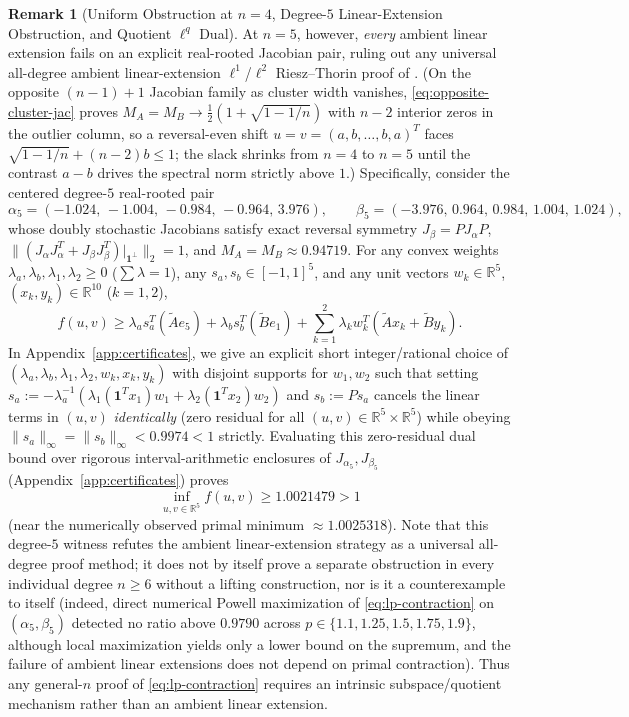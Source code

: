 \documentclass[11pt,a4paper]{article}
\theoremstyle{definition}
\newtheorem{remark}[theorem]{Remark}
\newcommand{\R}{\mathbb{R}}
\newcommand{\one}{\mathbf{1}}
\begin{document}
\begin{remark}[Uniform Obstruction at $n = 4$, Degree-$5$ Linear-Extension Obstruction, and Quotient $\ell^q$ Dual]
At $n = 5$, however, \emph{every} ambient linear extension fails on an explicit real-rooted Jacobian pair, ruling out any universal all-degree ambient linear-extension $\ell^1$/$\ell^2$ Riesz--Thorin proof of \cite[Conjecture~5.2]{Hashemi2026}. (On the opposite $(n-1)+1$ Jacobian family as cluster width vanishes, \eqref{eq:opposite-cluster-jac} proves $M_A = M_B \to \frac{1}{2}(1 + \sqrt{1 - 1/n})$ with $n-2$ interior zeros in the outlier column, so a reversal-even shift $u = v = (a, b, \dots, b, a)^T$ faces $\sqrt{1 - 1/n} + (n-2)b \le 1$; the slack shrinks from $n=4$ to $n=5$ until the contrast $a - b$ drives the spectral norm strictly above $1$.) Specifically, consider the centered degree-$5$ real-rooted pair
\[
\alpha_5 = (-1.024,\, -1.004,\, -0.984,\, -0.964,\, 3.976), \qquad \beta_5 = (-3.976,\, 0.964,\, 0.984,\, 1.004,\, 1.024),
\]
whose doubly stochastic Jacobians satisfy exact reversal symmetry $J_\beta = P J_\alpha P$, $\|(J_\alpha J_\alpha^T + J_\beta J_\beta^T)|_{\one^\perp}\|_2 = 1$, and $M_A = M_B \approx 0.94719$. For any convex weights $\lambda_a, \lambda_b, \lambda_1, \lambda_2 \ge 0$ ($\sum \lambda = 1$), any $s_a, s_b \in [-1, 1]^5$, and any unit vectors $w_k \in \R^5$, $(x_k, y_k) \in \R^{10}$ ($k = 1, 2$),
\[
f(u, v) \ge \lambda_a s_a^T(\tilde{A} e_5) + \lambda_b s_b^T(\tilde{B} e_1) + \sum_{k=1}^2 \lambda_k w_k^T(\tilde{A} x_k + \tilde{B} y_k).
\]
In Appendix~\ref{app:certificates}, we give an explicit short integer/rational choice of $(\lambda_a, \lambda_b, \lambda_1, \lambda_2, w_k, x_k, y_k)$ with disjoint supports for $w_1, w_2$ such that setting $s_a := -\lambda_a^{-1}(\lambda_1(\one^T x_1)w_1 + \lambda_2(\one^T x_2)w_2)$ and $s_b := P s_a$ cancels the linear terms in $(u, v)$ \emph{identically} (zero residual for all $(u, v) \in \R^5 \times \R^5$) while obeying $\|s_a\|_\infty = \|s_b\|_\infty < 0.9974 < 1$ strictly. Evaluating this zero-residual dual bound over rigorous interval-arithmetic enclosures of $J_{\alpha_5}, J_{\beta_5}$ (Appendix~\ref{app:certificates}) proves
\[
\inf_{u, v \in \R^5} f(u, v) \ge 1.0021479 > 1
\]
(near the numerically observed primal minimum $\approx 1.0025318$). Note that this degree-$5$ witness refutes the ambient linear-extension strategy as a universal all-degree proof method; it does not by itself prove a separate obstruction in every individual degree $n \ge 6$ without a lifting construction, nor is it a counterexample to \cite[Conjecture~5.2]{Hashemi2026} itself (indeed, direct numerical Powell maximization of \eqref{eq:lp-contraction} on $(\alpha_5, \beta_5)$ detected no ratio above $0.9790$ across $p \in \{1.1, 1.25, 1.5, 1.75, 1.9\}$, although local maximization yields only a lower bound on the supremum, and the failure of ambient linear extensions does not depend on primal contraction). Thus any general-$n$ proof of \eqref{eq:lp-contraction} requires an intrinsic subspace/quotient mechanism rather than an ambient linear extension.


\end{remark}
\end{document}

